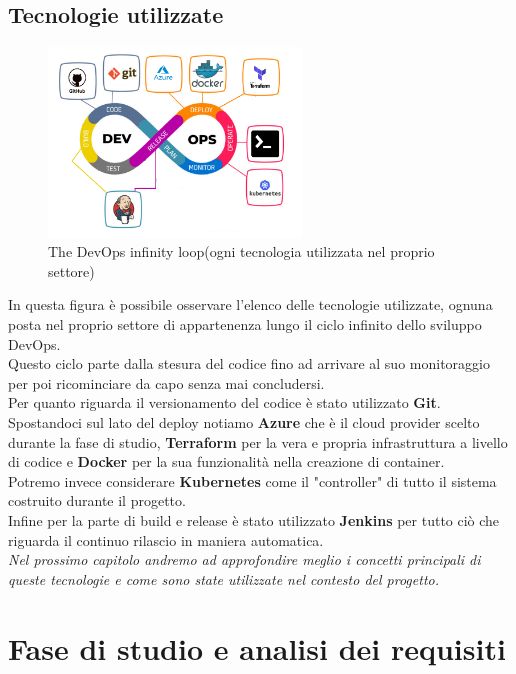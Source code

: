 \documentclass[a4paper,12pt]{report}
\begin{document}
\section{Tecnologie utilizzate}
\begin{figure}[h]
	\includegraphics[width=0.6\textwidth]{tech_used}
    \caption{The DevOps infinity loop(ogni tecnologia utilizzata nel proprio settore) \cite{devopsloopimg}}
    \label{fig:tech_used}
\end{figure}
In questa figura è possibile osservare l'elenco delle tecnologie utilizzate, ognuna posta nel proprio settore di appartenenza lungo il ciclo infinito dello sviluppo DevOps.\cite{devopsloop}\\
Questo ciclo parte dalla stesura del codice fino ad arrivare al suo monitoraggio per poi ricominciare da capo senza mai concludersi.\\
Per quanto riguarda il versionamento del codice è stato utilizzato \textbf{Git}. \\
Spostandoci sul lato del deploy notiamo \textbf{Azure} che è il cloud provider scelto durante la fase di studio, \textbf{Terraform} per la vera e propria infrastruttura a livello di codice e \textbf{Docker} per la sua funzionalità nella creazione di container.\\
Potremo invece considerare \textbf{Kubernetes}  come il "controller" di tutto il sistema costruito durante il progetto.\\
Infine per la parte di build e release è stato utilizzato \textbf{Jenkins} per tutto ciò che riguarda il continuo rilascio in maniera automatica.\\
\textit{Nel prossimo capitolo andremo ad approfondire meglio i concetti principali di queste tecnologie e come sono state utilizzate nel contesto del progetto.}


\chapter{Fase di studio e analisi dei requisiti}
\end{document}
